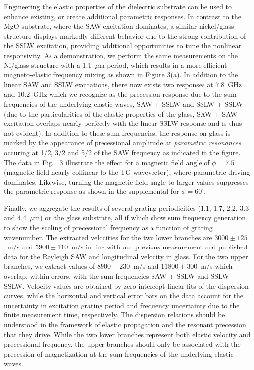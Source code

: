 \documentclass[aps,showpacs,prb,twocolumn,superscriptaddress]{revtex4}
\begin{document}
Engineering the elastic properties of the dielectric substrate can be used to enhance existing, or create additional parametric responses. In contrast to the MgO substrate, where the SAW excitation dominates, a similar nickel/glass structure displays markedly different behavior due to the strong contribution of the SSLW excitation\cite{Janusonis2016}, providing additional opportunities to tune the nonlinear responsivity.  As a demonstration, we perform the same measurements on the Ni/glass structure with a 1.1~$\mu$m period, which results in a more efficient magneto-elastic frequency mixing as shown in Figure 3(a). In addition to the linear SAW and SSLW excitations, there now exists two responses at $7.8$~GHz and $10.2$~GHz which we recognize as the precession response due to the sum frequencies of the underlying elastic waves, SAW + SSLW and SSLW + SSLW (due to the particularities of the elastic properties of the glass, SAW + SAW excitation overlaps nearly perfectly with the linear SSLW response and is thus not evident).  In addition to these sum frequencies, the response on glass is marked by the appearance of precessional amplitude at {\it parametric resonances} occuring at 1/2, 3/2 and 5/2 of the SAW frequency as indicated in the figure. The data in Fig. ~3 illustrate the effect for a magnetic field angle of $\phi=7.5^{\circ}$ (magnetic field nearly collinear to the TG wavevector), where parametric driving dominates.  Likewise, turning the magnetic field angle to larger values suppresses the parametric response as shown in the supplemental for $\phi=60^{\circ}$.

Finally, we aggregate the results of several grating periodicities (1.1, 1.7, 2.2, 3.3 and 4.4~$\mu$m) on the glass substrate, all if which show sum frequency generation, to show the scaling of precessional frequency as a function of grating wavenumber. The extracted velocities for the two lower branches are $3000 \pm 125$~m/s and $5900 \pm 110$~m/s in line with our previous measurement and published data for the Rayleigh SAW and longitudinal velocity in glass. For the two upper branches, we extract values of $8900 \pm 230$~m/s and $11800 \pm 300$~m/s which overlap, within errors, with the sum frequencies SAW + SSLW and SSLW + SSLW.  Velocity values are obtained by zero-intercept linear fits of the dispersion curves, while the horizontal and vertical error bars on the data account for the uncertainty in excitation grating period and frequency uncertainty due to the finite measurement time, respectively.  The dispersion relations should be understood in the framework of elastic propagation and the resonant precession that they drive.  While the two lower branches represent both elastic velocity and precessional frequency, the upper branches should only be associated with the precession of magnetization at the sum frequencies of the underlying elastic waves.
\end{document}
